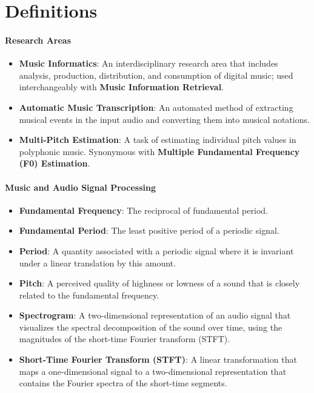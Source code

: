 \section{Definitions}

\paragraph{Research Areas}

\begin{itemize}
	\item \textbf{Music Informatics}: An interdisciplinary research area that includes analysis, production, distribution, and consumption  of digital music; used interchangeably with \textbf{Music Information Retrieval}.
	\item \textbf{Automatic Music Transcription}: An automated method of extracting musical events in the input audio and converting them into musical notations.
	\item \textbf{Multi-Pitch Estimation}: A task of estimating individual pitch values in polyphonic music. Synonymous with \textbf{Multiple Fundamental Frequency (F0) Estimation}.
\end{itemize}

\noindent \begin{minipage}{\textwidth}
\paragraph{Music and Audio Signal Processing}

\begin{itemize}
	\item \textbf{Fundamental Frequency}: The reciprocal of fundamental period.
	\item \textbf{Fundamental Period}: The least positive period of a periodic signal.
	\item \textbf{Period}: A quantity associated with a periodic signal where it is invariant under a linear translation by this amount.
	\item \textbf{Pitch}: A perceived quality of highness or lowness of a sound that is closely related to the fundamental frequency.
	\item \textbf{Spectrogram}: A two-dimensional representation of an audio signal that visualizes the spectral decomposition of the sound over time, using the magnitudes of the short-time Fourier transform (STFT).
	\item \textbf{Short-Time Fourier Transform (STFT)}: A linear transformation that maps a one-dimensional signal to a two-dimensional representation that contains the Fourier spectra of the short-time segments.
\end{itemize}
\end{minipage}

